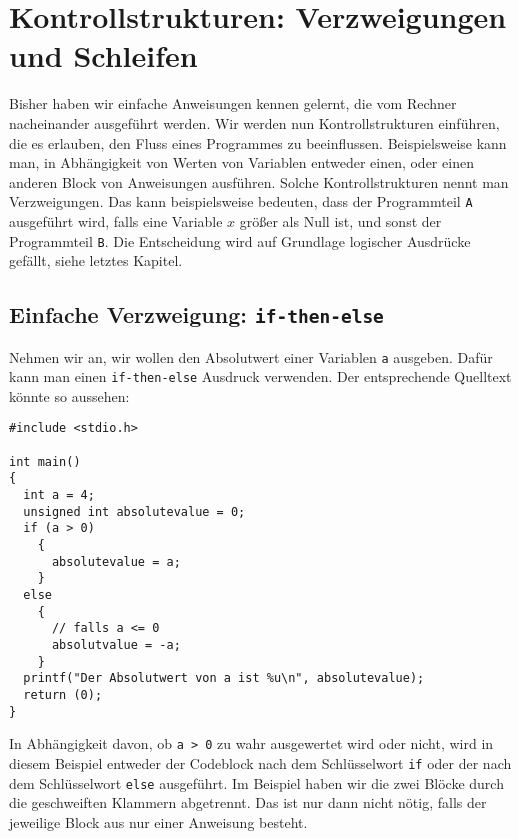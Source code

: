 \section{Kontrollstrukturen: Verzweigungen und Schleifen}

Bisher haben wir einfache Anweisungen kennen gelernt, die vom Rechner nacheinander ausgeführt werden.
Wir werden nun Kontrollstrukturen einführen, die es erlauben, den Fluss eines Programmes zu beeinflussen.
Beispielsweise kann man, in Abhängigkeit von Werten von Variablen entweder einen, oder einen anderen Block von Anweisungen ausführen.
Solche Kontrollstrukturen nennt man Verzweigungen.
Das kann beispielsweise bedeuten, dass der Programmteil \texttt{A} ausgeführt wird, falls eine Variable $x$ größer als Null ist, und sonst der Programmteil \texttt{B}.
Die Entscheidung wird auf Grundlage logischer Ausdrücke gefällt, siehe letztes Kapitel.

\subsection{Einfache Verzweigung: \texttt{if-then-else}}

Nehmen wir an, wir wollen den Absolutwert einer Variablen \verb|a| ausgeben.
Dafür kann man einen \verb|if-then-else| Ausdruck verwenden.
Der entsprechende Quelltext könnte so aussehen:
\begin{lstlisting}
#include <stdio.h>

int main()
{
  int a = 4;
  unsigned int absolutevalue = 0;
  if (a > 0)
    {
      absolutevalue = a;
    }
  else
    {
      // falls a <= 0
      absolutvalue = -a;
    }
  printf("Der Absolutwert von a ist %u\n", absolutevalue);
  return (0);
}
\end{lstlisting}
In Abhängigkeit davon, ob \verb|a > 0| zu wahr ausgewertet wird oder nicht, wird in diesem Beispiel entweder der Codeblock nach dem Schlüsselwort \verb|if| oder der nach dem Schlüsselwort \verb|else| ausgeführt.
Im Beispiel haben wir die zwei Blöcke durch die geschweiften Klammern abgetrennt. 
Das ist nur dann nicht nötig, falls der jeweilige Block aus nur einer Anweisung besteht.


